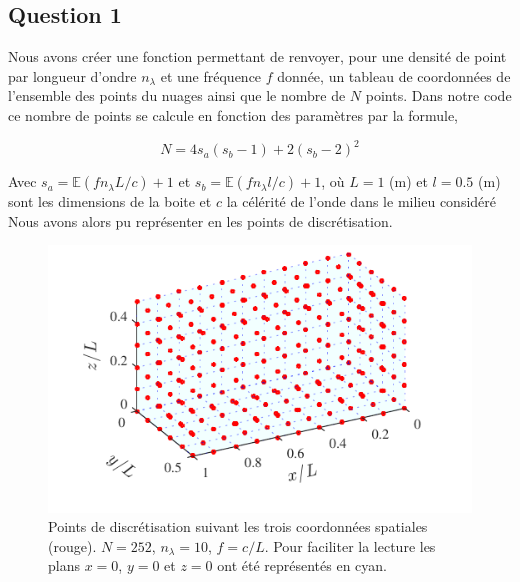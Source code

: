 \documentclass[10pt]{article}
\begin{document}
\begin{multicols}{2}



\section*{Question 1}

Nous avons créer une fonction permettant de renvoyer, pour une densité de point par longueur d'ondre $n_\lambda$ et une fréquence $f$ donnée, un tableau de coordonnées de l'ensemble des points du nuages ainsi que le nombre de $N$ points. Dans notre code ce nombre de points se calcule en fonction des paramètres par la formule, 

\begin{equation}
N = 4s_a(s_b-1) + 2(s_b-2)^{2}
\label{eq:N}
\end{equation}

Avec $s_a = \mathbb{E}(f n_\lambda L/c)+1$ et $s_b = \mathbb{E}(f n_\lambda l/c)+1$, où $L=1$ (m) et $l=0.5$ (m) sont les dimensions de la boite et $c$ la célérité de l'onde dans le milieu considéré Nous avons alors pu représenter en  les points de discrétisation.


\begin{figure}[H]
  \begin{center}
  \includegraphics[width=0.95\columnwidth]{Q1_4.pdf}
  \vspace*{-11pt}
  \caption{Points de discrétisation suivant les trois coordonnées spatiales (rouge). $N=252$, $n_\lambda = 10$, $f = c/L$. Pour faciliter la lecture les plans $x=0$, $y=0$ et $z=0$ ont été représentés en cyan.}
  \label{fig:Q1}
  \end{center}
\end{figure}
\vspace*{-22pt}



\end{multicols}
\end{document}
